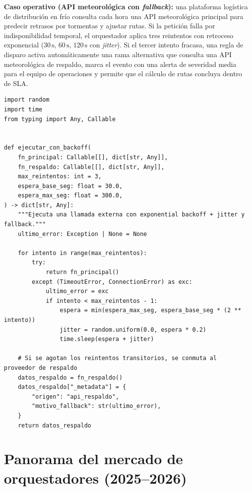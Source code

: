 \textbf{Caso operativo (API meteorológica con \textit{fallback}):} una plataforma logística de distribución en frío consulta cada hora una API meteorológica principal para predecir retrasos por tormentas y ajustar rutas. Si la petición falla por indisponibilidad temporal, el orquestador aplica tres reintentos con retroceso exponencial ($30\,\text{s}$, $60\,\text{s}$, $120\,\text{s}$ con \textit{jitter}). Si el tercer intento fracasa, una regla de disparo activa automáticamente una rama alternativa que consulta una API meteorológica de respaldo, marca el evento con una alerta de severidad media para el equipo de operaciones y permite que el cálculo de rutas concluya dentro de SLA.

\begin{lstlisting}[style=python, caption={Patrón conceptual de política de reintento con retroceso exponencial y ruta de respaldo (\textit{fallback}) para una API meteorológica.}, label={lst:fallback-pattern}]
import random
import time
from typing import Any, Callable


def ejecutar_con_backoff(
    fn_principal: Callable[[], dict[str, Any]],
    fn_respaldo: Callable[[], dict[str, Any]],
    max_reintentos: int = 3,
    espera_base_seg: float = 30.0,
    espera_max_seg: float = 300.0,
) -> dict[str, Any]:
    """Ejecuta una llamada externa con exponential backoff + jitter y fallback."""
    ultimo_error: Exception | None = None

    for intento in range(max_reintentos):
        try:
            return fn_principal()
        except (TimeoutError, ConnectionError) as exc:
            ultimo_error = exc
            if intento < max_reintentos - 1:
                espera = min(espera_max_seg, espera_base_seg * (2 ** intento))
                jitter = random.uniform(0.0, espera * 0.2)
                time.sleep(espera + jitter)

    # Si se agotan los reintentos transitorios, se conmuta al proveedor de respaldo
    datos_respaldo = fn_respaldo()
    datos_respaldo["_metadata"] = {
        "origen": "api_respaldo",
        "motivo_fallback": str(ultimo_error),
    }
    return datos_respaldo
\end{lstlisting}

\section{Panorama del mercado de orquestadores (2025--2026)}\label{sec:mercado-orquestadores}

